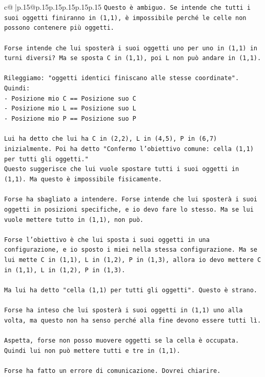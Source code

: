 \documentclass{article}
\begin{document}
{\begin{supertabular}{c@{$\;$}|p{.15\linewidth}@{}p{.15\linewidth}p{.15\linewidth}p{.15\linewidth}p{.15\linewidth}p{.15\linewidth}}
{{{\texttt{Questo è ambiguo. Se intende che tutti i suoi oggetti finiranno in (1,1), è impossibile perché le celle non possono contenere più oggetti.} \\
\\ 
\texttt{Forse intende che lui sposterà i suoi oggetti uno per uno in (1,1) in turni diversi? Ma se sposta C in (1,1), poi L non può andare in (1,1).} \\
\\ 
\texttt{Rileggiamo: "oggetti identici finiscano alle stesse coordinate".} \\
\texttt{Quindi:} \\
\texttt{{-} Posizione mio C == Posizione suo C} \\
\texttt{{-} Posizione mio L == Posizione suo L} \\
\texttt{{-} Posizione mio P == Posizione suo P} \\
\\ 
\texttt{Lui ha detto che lui ha C in (2,2), L in (4,5), P in (6,7) inizialmente. Poi ha detto "Confermo l'obiettivo comune: cella (1,1) per tutti gli oggetti."} \\
\texttt{Questo suggerisce che lui vuole spostare tutti i suoi oggetti in (1,1). Ma questo è impossibile fisicamente.} \\
\\ 
\texttt{Forse ha sbagliato a intendere. Forse intende che lui sposterà i suoi oggetti in posizioni specifiche, e io devo fare lo stesso. Ma se lui vuole mettere tutto in (1,1), non può.} \\
\\ 
\texttt{Forse l'obiettivo è che lui sposta i suoi oggetti in una configurazione, e io sposto i miei nella stessa configurazione. Ma se lui mette C in (1,1), L in (1,2), P in (1,3), allora io devo mettere C in (1,1), L in (1,2), P in (1,3).} \\
\\ 
\texttt{Ma lui ha detto "cella (1,1) per tutti gli oggetti". Questo è strano.} \\
\\ 
\texttt{Forse ha inteso che lui sposterà i suoi oggetti in (1,1) uno alla volta, ma questo non ha senso perché alla fine devono essere tutti lì.} \\
\\ 
\texttt{Aspetta, forse non posso muovere oggetti se la cella è occupata. Quindi lui non può mettere tutti e tre in (1,1).} \\
\\ 
\texttt{Forse ha fatto un errore di comunicazione. Dovrei chiarire.} \\
}}}
\end{supertabular}}
\end{document}
